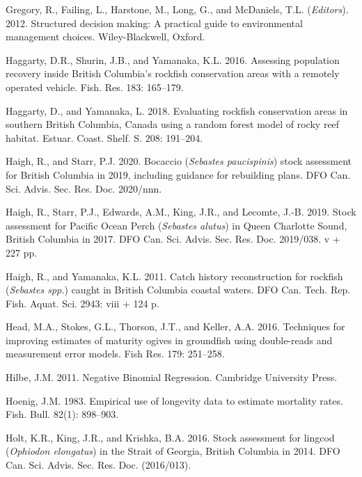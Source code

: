 \documentclass[11pt]{book}
\begin{document}
\leavevmode\hypertarget{ref-gregory2012}{}%
Gregory, R., Failing, L., Harstone, M., Long, G., and McDaniels, T.L. (\emph{Editors}). 2012. Structured decision making: A practical guide to environmental management choices. Wiley-Blackwell, Oxford.

\leavevmode\hypertarget{ref-haggarty2016b}{}%
Haggarty, D.R., Shurin, J.B., and Yamanaka, K.L. 2016. Assessing population recovery inside British Columbia's rockfish conservation areas with a remotely operated vehicle. Fish. Res. 183: 165--179.

\leavevmode\hypertarget{ref-haggarty2018}{}%
Haggarty, D., and Yamanaka, L. 2018. Evaluating rockfish conservation areas in southern British Columbia, Canada using a random forest model of rocky reef habitat. Estuar. Coast. Shelf. S. 208: 191--204.

\leavevmode\hypertarget{ref-haigh2020}{}%
Haigh, R., and Starr, P.J. 2020. Bocaccio (\emph{Sebastes paucispinis}) stock assessment for British Columbia in 2019, including guidance for rebuilding plans. DFO Can. Sci. Advis. Sec. Res. Doc. 2020/nnn.

\leavevmode\hypertarget{ref-haigh2019}{}%
Haigh, R., Starr, P.J., Edwards, A.M., King, J.R., and Lecomte, J.-B. 2019. Stock assessment for Pacific Ocean Perch (\emph{Sebastes alutus}) in Queen Charlotte Sound, British Columbia in 2017. DFO Can. Sci. Advis. Sec. Res. Doc. 2019/038. v + 227 pp.

\leavevmode\hypertarget{ref-haigh2011}{}%
Haigh, R., and Yamanaka, K.L. 2011. Catch history reconstruction for rockfish (\emph{Sebastes spp.}) caught in British Columbia coastal waters. DFO Can. Tech. Rep. Fish. Aquat. Sci. 2943: viii + 124 p.

\leavevmode\hypertarget{ref-head2016}{}%
Head, M.A., Stokes, G.L., Thorson, J.T., and Keller, A.A. 2016. Techniques for improving estimates of maturity ogives in groundfish using double-reads and measurement error models. Fish Res. 179: 251--258.

\leavevmode\hypertarget{ref-hilbe2011}{}%
Hilbe, J.M. 2011. Negative Binomial Regression. Cambridge University Press.

\leavevmode\hypertarget{ref-hoenig1983}{}%
Hoenig, J.M. 1983. Empirical use of longevity data to estimate mortality rates. Fish. Bull. 82(1): 898--903.

\leavevmode\hypertarget{ref-holt2016}{}%
Holt, K.R., King, J.R., and Krishka, B.A. 2016. Stock assessment for lingcod (\emph{Ophiodon elongatus}) in the Strait of Georgia, British Columbia in 2014. DFO Can. Sci. Advis. Sec. Res. Doc. (2016/013).
\end{document}

